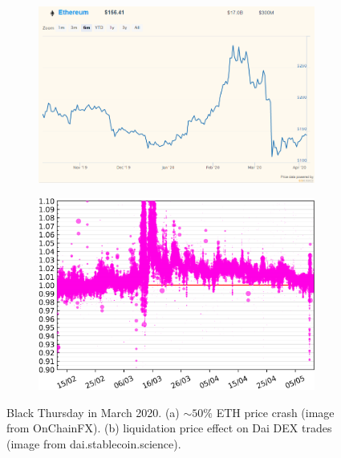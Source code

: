 \begin{figure}
	\centering
	\begin{subfigure}[b]{0.49\textwidth}
		\includegraphics[width=\textwidth]{figures/ETH_prices_Mar2020_onchainfx}
		\caption{}\label{fig:eth_mar20}
	\end{subfigure}
	\begin{subfigure}[b]{0.49\textwidth}
		\includegraphics[width=\textwidth]{figures/ETHDAI-chart-90d}
		\caption{}\label{fig:dai_mar20}
	\end{subfigure}
	\caption{Black Thursday in March 2020. (a) $\sim 50\%$ ETH price crash (image from OnChainFX). (b) liquidation price effect on Dai DEX trades (image from dai.stablecoin.science).}\label{fig:mar20}
\end{figure}













